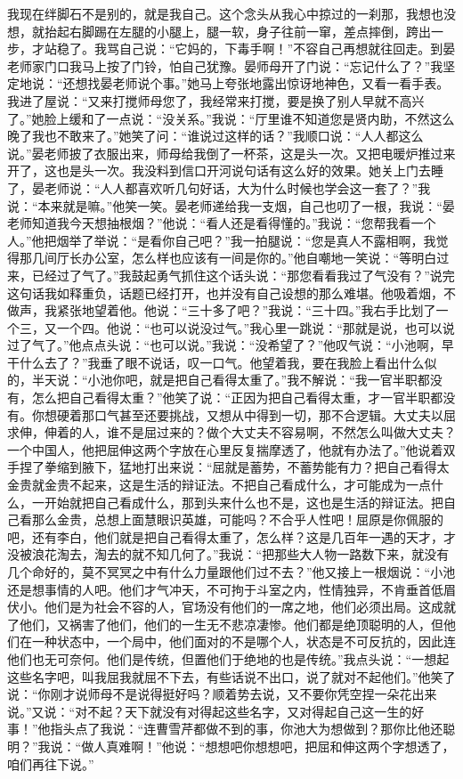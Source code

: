 \documentclass[12pt,oneside]{book}
\begin{document}
我现在绊脚石不是别的，就是我自己。这个念头从我心中掠过的一刹那，我想也没想，就抬起右脚踢在左腿的小腿上，腿一软，身子往前一窜，差点摔倒，跨出一步，才站稳了。我骂自己说：``它妈的，下毒手啊！''不容自己再想就往回走。到晏老师家门口我马上按了门铃，怕自己犹豫。晏师母开了门说：``忘记什么了？''我坚定地说：``还想找晏老师说个事。''她马上夸张地露出惊讶地神色，又看一看手表。我进了屋说：``又来打搅师母您了，我经常来打搅，要是换了别人早就不高兴了。''她脸上缓和了一点说：``没关系。''我说：``厅里谁不知道您是贤内助，不然这么晚了我也不敢来了。''她笑了问：``谁说过这样的话？''我顺口说：``人人都这么说。''晏老师披了衣服出来，师母给我倒了一杯茶，这是头一次。又把电暖炉推过来开了，这也是头一次。我没料到信口开河说句话有这么好的效果。她关上门去睡了，晏老师说：``人人都喜欢听几句好话，大为什么时候也学会这一套了？''我说：``本来就是嘛。''他笑一笑。晏老师递给我一支烟，自己也叨了一根，我说：``晏老师知道我今天想抽根烟？''他说：``看人还是看得懂的。''我说：``您帮我看一个人。''他把烟举了举说：``是看你自己吧？''我一拍腿说：``您是真人不露相啊，我觉得那几间厅长办公室，怎么样也应该有一间是你的。''他自嘲地一笑说：``等明白过来，已经过了气了。''我鼓起勇气抓住这个话头说：``那您看看我过了气没有？''说完这句话我如释重负，话题已经打开，也并没有自己设想的那么难堪。他吸着烟，不做声，我紧张地望着他。他说：``三十多了吧？''我说：``三十四。''我右手比划了一个三，又一个四。他说：``也可以说没过气。''我心里一跳说：``那就是说，也可以说过了气了。''他点点头说：``也可以说。''我说：``没希望了？''他叹气说：``小池啊，早干什么去了？''我垂了眼不说话，叹一口气。他望着我，要在我脸上看出什么似的，半天说：``小池你吧，就是把自己看得太重了。''我不解说：``我一官半职都没有，怎么把自己看得太重？''他笑了说：``正因为把自己看得太重，才一官半职都没有。你想硬着那口气甚至还要挑战，又想从中得到一切，那不合逻辑。大丈夫以屈求伸，伸着的人，谁不是屈过来的？做个大丈夫不容易啊，不然怎么叫做大丈夫？一个中国人，他把屈伸这两个字放在心里反复揣摩透了，他就有办法了。''他说着双手捏了拳缩到腋下，猛地打出来说：``屈就是蓄势，不蓄势能有力？把自己看得太金贵就金贵不起来，这是生活的辩证法。不把自己看成什么，才可能成为一点什么，一开始就把自己看成什么，那到头来什么也不是，这也是生活的辩证法。把自己看那么金贵，总想上面慧眼识英雄，可能吗？不合乎人性吧！屈原是你佩服的吧，还有李白，他们就是把自己看得太重了，怎么样？这是几百年一遇的天才，才没被浪花淘去，淘去的就不知几何了。''我说：``把那些大人物一路数下来，就没有几个命好的，莫不冥冥之中有什么力量跟他们过不去？''他又接上一根烟说：``小池还是想事情的人吧。他们才气冲天，不可拘于斗室之内，性情独异，不肯垂首低眉伏小。他们是为社会不容的人，官场没有他们的一席之地，他们必须出局。这成就了他们，又祸害了他们，他们的一生无不悲凉凄惨。他们都是绝顶聪明的人，但他们在一种状态中，一个局中，他们面对的不是哪个人，状态是不可反抗的，因此连他们也无可奈何。他们是传统，但置他们于绝地的也是传统。''我点头说：``一想起这些名字吧，叫我屈我就屈不下去，有些话说不出口，说了就对不起他们。''他笑了说：``你刚才说师母不是说得挺好吗？顺着势去说，又不要你凭空捏一朵花出来说。''又说：``对不起？天下就没有对得起这些名字，又对得起自己这一生的好事！''他指头点了我说：``连曹雪芹都做不到的事，你池大为想做到？那你比他还聪明？''我说：``做人真难啊！''他说：``想想吧你想想吧，把屈和伸这两个字想透了，咱们再往下说。''
\end{document}
